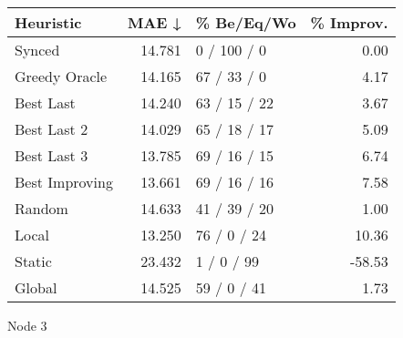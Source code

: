 \begin{tabular}{lrlr}
\toprule
\textbf{Heuristic} & \textbf{MAE ↓} & \textbf{\% Be/Eq/Wo} & \textbf{\% Improv.} \\
\midrule
            Synced &         14.781 &          0 / 100 / 0 &                0.00 \\
     Greedy Oracle &         14.165 &          67 / 33 / 0 &                4.17 \\
         Best Last &         14.240 &         63 / 15 / 22 &                3.67 \\
       Best Last 2 &         14.029 &         65 / 18 / 17 &                5.09 \\
       Best Last 3 &         13.785 &         69 / 16 / 15 &                6.74 \\
    Best Improving &         13.661 &         69 / 16 / 16 &                7.58 \\
            Random &         14.633 &         41 / 39 / 20 &                1.00 \\
             Local &         13.250 &          76 / 0 / 24 &               10.36 \\
            Static &         23.432 &           1 / 0 / 99 &              -58.53 \\
            Global &         14.525 &          59 / 0 / 41 &                1.73 \\
\bottomrule
\end{tabular}
\caption{Node 3}
\label{tab:iid_lr01_le1_bs4_3}
